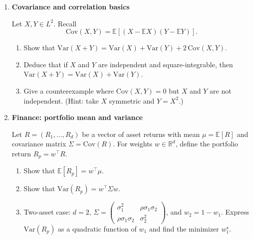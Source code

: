 \documentclass[11pt]{article}
\begin{document}
\begin{enumerate}[leftmargin=*, itemsep=1.2em]
Let $(X,Y)$ have joint density
\[
f_{X,Y}(x,y)=6x^2y\,\mathbf{1}_{\{0\le x\le 1,\ 0\le y\le 1\}}.
\]
\begin{enumerate}[label=(\alph*)]
\item Check that $f_{X,Y}$ integrates to $1$ on $[0,1]^2$.
\item Compute $f_X(x)$ and $f_Y(y)$.
\item Show that $X$ and $Y$ are independent.
\item Compute $\mathbb{E}[X]$, $\mathbb{E}[Y]$, and $\mathrm{Var}(X)$.
\end{enumerate}

\item \textbf{Covariance and correlation basics}

Let $X,Y\in L^2$. Recall
\[
\mathrm{Cov}(X,Y)=\mathbb{E}[(X-\mathbb{E}X)(Y-\mathbb{E}Y)].
\]
\begin{enumerate}[label=(\alph*)]
\item Show that $\mathrm{Var}(X+Y)=\mathrm{Var}(X)+\mathrm{Var}(Y)+2\,\mathrm{Cov}(X,Y)$.
\item Deduce that if $X$ and $Y$ are independent and square-integrable, then
$\mathrm{Var}(X+Y)=\mathrm{Var}(X)+\mathrm{Var}(Y)$.
\item Give a counterexample where $\mathrm{Cov}(X,Y)=0$ but $X$ and $Y$ are not independent.
(Hint: take $X$ symmetric and $Y=X^2$.)
\end{enumerate}

\item \textbf{Finance: portfolio mean and variance}

Let $R=(R_1,\dots,R_d)$ be a vector of asset returns with mean $\mu=\mathbb{E}[R]$
and covariance matrix $\Sigma=\mathrm{Cov}(R)$.
For weights $w\in\mathbb{R}^d$, define the portfolio return $R_p=w^\top R$.
\begin{enumerate}[label=(\alph*)]
\item Show that $\mathbb{E}[R_p]=w^\top \mu$.
\item Show that $\mathrm{Var}(R_p)=w^\top\Sigma w$.
\item Two-asset case: $d=2$, $\Sigma=\begin{pmatrix}\sigma_1^2&\rho\sigma_1\sigma_2\\ \rho\sigma_1\sigma_2&\sigma_2^2\end{pmatrix}$,
and $w_2=1-w_1$. Express $\mathrm{Var}(R_p)$ as a quadratic function of $w_1$ and find the minimizer $w_1^\star$.
\end{enumerate}


\end{enumerate}
\end{document}
